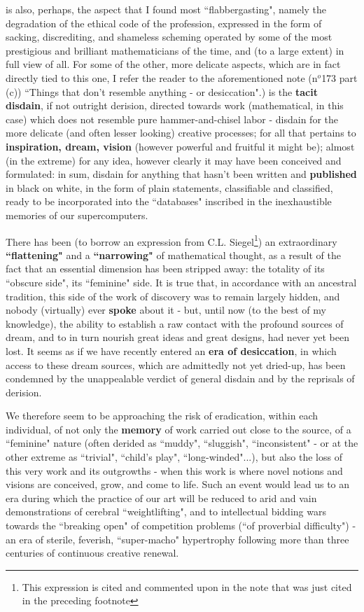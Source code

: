 {is also, perhaps, the aspect that I found most ``flabbergasting", namely the degradation of the ethical code of the profession, expressed in the form of sacking, discrediting, and shameless scheming operated by some of the most prestigious and brilliant mathematicians of the time, and (to a large extent) in full view of all. For some of the other, more delicate aspects, which are in fact directly tied to this one, I refer the reader to the aforementioned note (n$^o$173 part (c)) ``Things that don't resemble anything - or desiccation".}) is the \textbf{tacit disdain}, if not outright derision, directed towards work (mathematical, in this case) which does not resemble pure hammer-and-chisel labor - disdain for the more delicate (and often lesser looking) creative processes; for all that pertains to \textbf{inspiration, dream, vision} (however powerful and fruitful it might be); almost (in the extreme) for any idea, however clearly it may have been conceived and formulated: in sum, disdain for anything that hasn't been written and \textbf{published} in black on white, in the form of plain statements, classifiable and classified, ready to be incorporated into the ``databases" inscribed in the inexhaustible memories of our supercomputers. 

There has been (to borrow an expression from C.L. Siegel\footnote{This expression is cited and commented upon in the note that was just cited in the preceding footnote}) an extraordinary \textbf{``flattening"} and a \textbf{``narrowing"} of mathematical thought, as a result of the fact that an essential dimension has been stripped away: the totality of its ``obscure side", its ``feminine" side. It is true that, in accordance with an ancestral tradition, this side of the work of discovery was to remain largely hidden, and nobody (virtually) ever \textbf{spoke} about it - but, until now (to the best of my knowledge), the ability to establish a raw contact with the profound sources of dream, and to in turn nourish great ideas and great designs, had never yet been lost. It seems as if we have recently entered an \textbf{era of desiccation}, in which access to these dream sources, which are admittedly not yet dried-up, has been condemned by the unappealable verdict of general disdain and by the reprisals of derision. 

We therefore seem to be approaching the risk of eradication, within each individual, of not only the \textbf{memory} of work carried out close to the source, of a ``feminine" nature (often derided as ``muddy", ``sluggish", ``inconsistent" - or at the other extreme as ``trivial", ``child's play", ``long-winded"...), but also the loss of this very work and its outgrowths - when this work is where novel notions and visions are conceived, grow, and come to life. Such an event would lead us to an era during which the practice of our art will be reduced to arid and vain demonstrations of cerebral ``weightlifting", and to intellectual bidding wars towards the ``breaking open" of competition problems (``of proverbial difficulty") - an era of sterile, feverish, ``super-macho" hypertrophy following more than three centuries of continuous creative renewal. 

